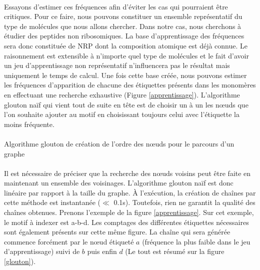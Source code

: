 \documentclass[12pt,french,twoside]{report}
\begin{document}
\paragraph{}Essayons d'estimer ces fréquences afin d'éviter les cas qui pourraient être critiques. Pour ce faire, nous pouvons
constituer un ensemble représentatif du type de molécules que nous allons chercher.
Dans notre cas, nous cherchons à étudier des peptides non ribosomiques. La base d'apprentissage
des fréquences sera donc constituée de NRP dont la composition atomique est déjà connue. Le raisonnement est extensible à
n'importe quel type de molécules et le fait d'avoir un jeu d'apprentissage non représentatif n'influencera pas le résultat mais
uniquement le temps de calcul. Une fois cette base créée, nous pouvons estimer les fréquences d'apparition de chacune des étiquettes
présents dans les monomères en effectuant une recherche exhaustive (Figure \ref{apprentissage}). L'algorithme glouton naïf qui
vient tout de suite en tête est de choisir un à un les n\oe{}uds que l'on souhaite ajouter au motif en choisissant toujours celui
avec l'étiquette la moins fréquente.

\paragraph{}
  \begin{algorithm}[H]
    \caption{Algorithme glouton de création de l'ordre des n\oe{}uds pour le parcours d'un graphe}
 
  \end{algorithm}


\paragraph{}Il est nécessaire de préciser que la recherche des n\oe{}uds voisins peut être faite en maintenant
un ensemble des voisinages. L'algorithme glouton naïf est donc linéaire par rapport à la taille du graphe. À l'exécution, la
création de chaînes par cette méthode est instantanée ($\ll$ 0.1s). Toutefois, rien ne garantit la qualité des chaînes obtenues.
Prenons l'exemple de la figure \ref{apprentissage}. Sur cet exemple, le motif à indexer est a-b-d. Les comptages des différentes
étiquettes nécessaires sont également présents sur cette même figure. La chaîne qui sera générée commence forcément par le n\oe{}ud
étiqueté $a$ (fréquence la plus faible dans le jeu d'apprentissage) suivi de $b$ puis enfin $d$ (Le tout est résumé sur la figure
\ref{glouton}).
\end{document}
